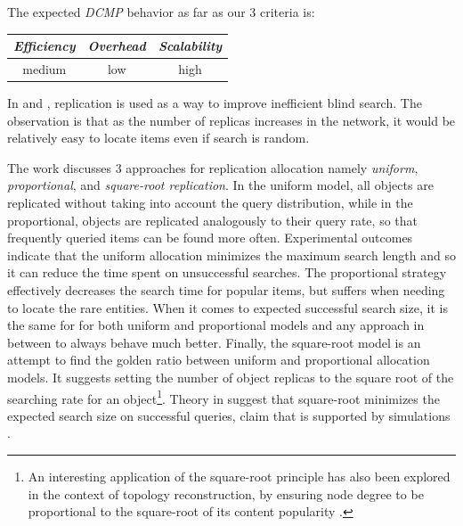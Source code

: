 The expected \emph{DCMP} behavior as far as our $3$ criteria is:
%
\begin{center}
{\footnotesize
\begin{tabular}{ccc}
\emph{Efficiency} & \emph{Overhead} & \emph{Scalability} \\
\hline
medium &
low &
high
\end{tabular}
}
\end{center}



In \cite{CS2002} and \cite{LCCLS2002}, replication is used as a way to improve
inefficient blind search. The observation is that as the number of replicas
increases in the network, it would be relatively easy to locate items even if
search is random.

The work discusses $3$ approaches for replication allocation namely \emph{uniform},
\emph{proportional}, and \emph{square-root replication}. In the uniform model,
all objects are replicated without taking into account the query distribution,
while in the proportional, objects are replicated analogously to their query
rate, so that frequently queried items can be found more often. Experimental
outcomes indicate that the uniform allocation minimizes the maximum search
length and so it can reduce the time spent on unsuccessful searches. The
proportional strategy effectively decreases the search time for popular items,
but suffers when needing to locate the rare entities. When it comes to expected
successful search size, it is the same for for both uniform and proportional
models and any approach in between to always behave much better. Finally, the
square-root model is an attempt to find the golden ratio between uniform and
proportional allocation models. It suggests setting the number of object
replicas to the square root of the searching rate for an object\footnote{An
interesting application of the square-root principle has also been explored
in the context of topology reconstruction, by ensuring node degree to be
proportional to the square-root of its content popularity \cite{C2005}.}.
Theory in \cite{CS2002} suggest that square-root minimizes the expected search size on
successful queries, claim that is supported by simulations \cite{LCCLS2002}.  

